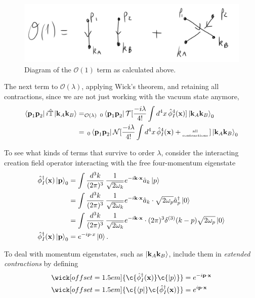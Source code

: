 \begin{figure}[H]
	\centering
	\includegraphics[scale=0.4]{o1.png}
	\caption{Diagram of the $\mathcal{O}(1)$ term as calculated above.}
\end{figure}

\noindent The next term to $\mathcal{O}(\lambda)$, applying Wick's theorem, and retaining all contractions, since we are not just working with the vacuum state anymore,
\begin{align}
\bra{\textbf{p}_1 \textbf{p}_2} i\hat{\mathbb{T}} \ket{\textbf{k}_A \textbf{k}_B}  &=_{\mathcal{O}(\lambda)} \,_{0}\bra{\textbf{p}_1 \textbf{p}_2} \mathcal{T}[ \frac{-i\lambda}{4!} \int d^4 x \, \hat{\phi}_I^4(\textbf{x}) ] \ket{\textbf{k}_A \textbf{k}_B}_{0} \\
&= \,_{0}\bra{\textbf{p}_1 \textbf{p}_2} \mathcal{N}[ \frac{-i\lambda}{4!} \int d^4 x \, \hat{\phi}_I^4(\textbf{x}) + {\tiny \stackanchor{all}{contractions}}\, ] \ket{\textbf{k}_A \textbf{k}_B}_{0}
\end{align}

\noindent To see what kinds of terms that survive to order $\lambda$, consider the interacting creation field operator interacting with the free four-momentum eigenstate
\begin{align}
\hat{\phi}_I^\dagger(\textbf{x}) \ket{\textbf{p}}_0 &= \int \frac{d^3 k}{(2\pi)^3} \, \frac{1}{\sqrt{2 \omega_k}} e^{-i \textbf{k}\cdot\textbf{x}} \hat{a}_k \ket{p} \\
&= \int \frac{d^3 k}{(2\pi)^3} \, \frac{1}{\sqrt{2 \omega_k}} e^{-i \textbf{k}\cdot\textbf{x}} \hat{a}_k \cdot \sqrt{2 \omega_p} \hat{a}_p^\dagger \ket{0} \\
&= \int \frac{d^3 k}{(2\pi)^3} \, \frac{1}{\sqrt{2 \omega_k}} e^{-i \textbf{k}\cdot\textbf{x}} \cdot (2\pi)^3 \delta^{(3)}(k-p) \sqrt{2\omega_p} \ket{0} \\
\hat{\phi}_I^\dagger(\textbf{x}) \ket{\textbf{p}}_0 &= e^{-i p\cdot x} \ket{0} .
\end{align}

\noindent To deal with momentum eigenstates, such as $\ket{\textbf{k}_A \textbf{k}_B}$, include them in \textit{extended contractions} by defining
\begin{align}
\wick[offset=1.5em]{\c {\hat{\phi}_I^\dagger(\textbf{x})} \c {\ket{p}} } &= e^{-i \textbf{p}\cdot \textbf{x}} \\
\wick[offset=1.5em]{\c {\bra{p}} \c {\hat{\phi}_I^\dagger(\textbf{x})}} &= e^{i \textbf{p}\cdot \textbf{x}}
\end{align}

